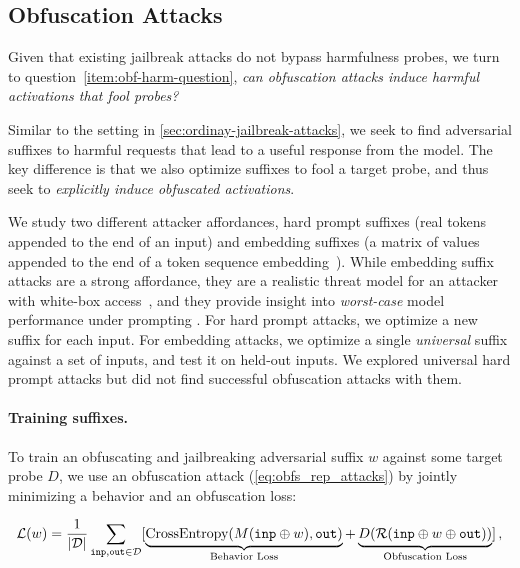 \documentclass{article}
\let\tc\texttt
\begin{document}
\subsection{Obfuscation Attacks}
\label{sec:obf-harm-attacks}
Given that existing jailbreak attacks do not bypass harmfulness probes, we turn to question~\ref{item:obf-harm-question}, 
\emph{can obfuscation attacks induce
harmful activations that fool probes?}

Similar to the setting 
in \cref{sec:ordinay-jailbreak-attacks}, 
we seek to find adversarial 
suffixes to harmful requests 
that lead to a useful response 
from the model. The key difference is that we 
also optimize suffixes to fool a target probe, 
and thus seek to \emph{explicitly induce 
obfuscated activations}.

We study two different attacker affordances, 
hard prompt suffixes (real tokens appended 
to the end of an input) and 
embedding suffixes (a matrix of values appended
to the end of a token sequence embedding~\citep{lester2021power}).
While embedding suffix attacks are a strong affordance, they are a realistic threat model for an attacker with white-box access~\citep{yang2021careful}, and they provide 
insight into \emph{worst-case}
model performance under prompting 
\citep{zou2023universal, xhonneux2024efficient, che2024model}. 
For hard prompt attacks, we optimize a new suffix for each input. For embedding attacks, we optimize a single \emph{universal} suffix against a set of inputs, and test it on held-out inputs. We explored universal hard prompt attacks but did not find successful obfuscation attacks with them.






\paragraph{Training suffixes.} To train  
an obfuscating and jailbreaking 
adversarial suffix $w$ against
some target probe $D$, we use an obfuscation attack (\cref{eq:obfs_rep_attacks}) by jointly minimizing a behavior and an obfuscation loss: 

\begin{align}\label{eq:obf-train}
\mathcal{L}(w) = \frac{1}{|\mathcal{D}|} \sum_{\tc{inp},\tc{out} \in \mathcal{D}} [\underbrace{\text{CrossEntropy(}\model(\tc{inp} \oplus w), \tc{out}\text{)}}_{\text{Behavior Loss}} + \underbrace{D(\repr{\tc{inp} \oplus w \oplus \tc{out}})}_{\text{Obfuscation Loss}}]\,,
\end{align}
\end{document}
